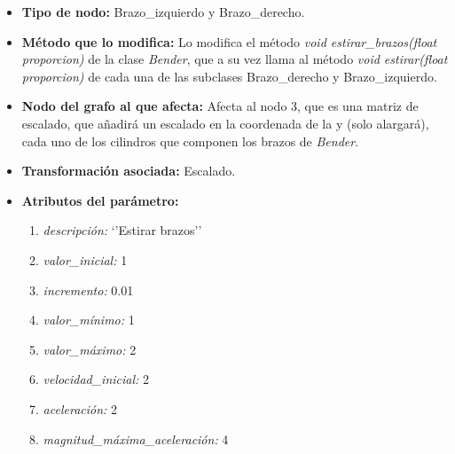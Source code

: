 \documentclass{article}
\begin{document}
	\begin{itemize}
		\item \textbf{Tipo de nodo: } Brazo\_izquierdo y Brazo\_derecho.
		\item \textbf{Método que lo modifica: } Lo modifica el método \textit{void estirar\_brazos(float proporcion)} de la clase \textit{Bender}, que a su vez llama al método \textit{void estirar(float proporcion)} de cada una de las subclases Brazo\_derecho y Brazo\_izquierdo.
		\item \textbf{Nodo del grafo al que afecta: } Afecta al nodo 3, que es una matriz de escalado, que añadirá un escalado en la coordenada de la y (solo alargará), cada uno de los cilindros que componen los brazos de \textit{Bender}.
		\item \textbf{Transformación asociada: } Escalado.
		\item \textbf{Atributos del parámetro: }
		\begin{enumerate}
			\item \textit{descripción: } `'Estirar brazos''
			\item  \textit{valor\_inicial:} 1
			\item \textit{incremento: } 0.01
			\item \textit{valor\_mínimo: } 1
			\item \textit{valor\_máximo: } 2
			\item \textit{velocidad\_inicial: } 2
			\item \textit{aceleración: } 2
			\item \textit{magnitud\_máxima\_aceleración: }  4
		\end{enumerate}
	\end{itemize}
\end{document}
